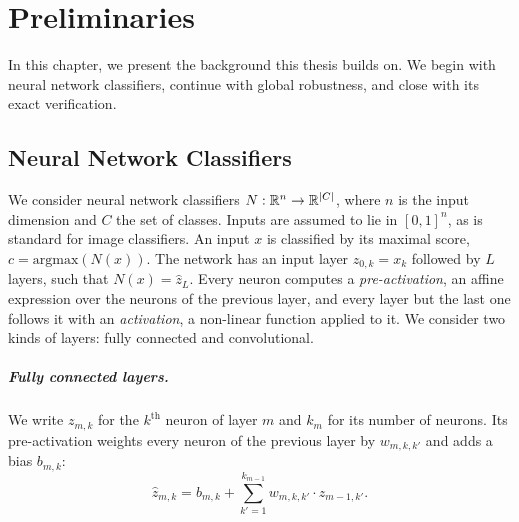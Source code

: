 %
%
%
\chapter{Preliminaries}
\label{ch:background}

In this chapter, we present the background this thesis builds on. We
begin with neural network classifiers, continue with global
robustness, and close with its exact verification.

\section{Neural Network Classifiers}
\label{sec:background-networks}

We consider neural network classifiers
$N : \mathbb{R}^{n} \to \mathbb{R}^{|C|}$, where $n$ is the input dimension and
$C$ the set of classes. Inputs are assumed to lie in $[0,1]^n$, as is
standard for image classifiers. An input $x$ is classified by its
maximal score, $c = \mathrm{argmax}(N(x))$. The network has an input
layer $z_{0,k} = x_k$ followed by $L$ layers, such that $N(x) = \hat{z}_L$.
Every neuron computes a \emph{pre-activation},
an affine expression over the neurons of the
previous layer, and every layer but the last one follows it with an
\emph{activation}, a non-linear function applied to it. We consider two kinds
of layers: fully connected and convolutional.

\paragraph{Fully connected layers.}
We write $z_{m,k}$ for the $k^{\text{th}}$ neuron of layer $m$ and $k_m$
for its number of neurons. Its
pre-activation weights every neuron of the previous layer by
$w_{m,k,k'}$ and adds a bias $b_{m,k}$:
\begin{equation}
  \hat{z}_{m,k} = b_{m,k}
  + \sum_{k'=1}^{k_{m-1}} w_{m,k,k'} \cdot z_{m-1,k'}.
  \label{eq:pre-activation}
\end{equation}

